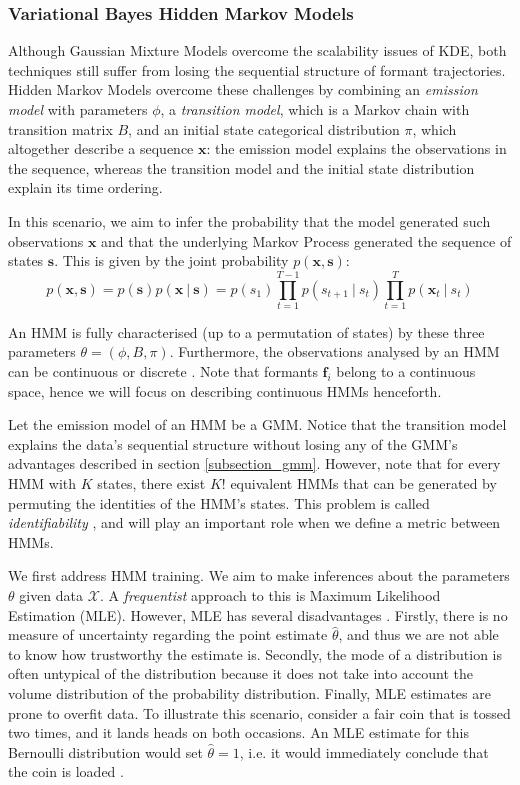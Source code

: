 \documentclass[pdftex,11pt,a4paper]{article}
\theoremstyle{definition}
\theoremstyle{remark}
\newcommand*{\V}[1]{\mathbf{#1}}%
\newcommand\given[1][]{\:#1\vert\:}
\begin{document}
\subsubsection{Variational Bayes Hidden Markov Models} \label{sub_hmms}
Although Gaussian Mixture Models overcome the scalability issues of KDE, both techniques still suffer from losing the sequential structure of formant trajectories. Hidden Markov Models overcome these challenges by combining an \emph{emission model} with parameters $\phi$, a \emph{transition model}, which is a Markov chain with transition matrix $B$, and an initial state categorical distribution $\pi$, which altogether describe a sequence $\V{x}$: the emission model explains the observations in the sequence, whereas the transition model and the initial state distribution explain its time ordering.
\par In this scenario, we aim to infer the probability that the model generated such observations $\V{x}$ and that the underlying Markov Process generated the sequence of states $\V{s}$. This is given by the joint probability $p(\V{x}, \V{s})$:
\begin{equation}\label{eq:hmm}
p(\V{x}, \V{s}) = p(\V{s})p(\V{x} \given \V{s}) = p(s_1)\prod_{t=1}^{T-1}p(s_{t+1}\given s_t)\prod_{t=1}^Tp(\V{x}_t \given s_t)
\end{equation} 
\par An HMM is fully characterised (up to a permutation of states) by these three parameters $\theta = (\phi, B, \pi)$. Furthermore, the observations analysed by an HMM can be continuous or discrete \cite{Jurafsky2009}. Note that formants $\V{f}_i$ belong to a continuous space, hence we will focus on describing continuous HMMs henceforth.
\par Let the emission model of an HMM be a GMM. Notice that the transition model explains the data's sequential structure without losing any of the GMM's advantages described in section \ref{subsection_gmm}. However, note that for every HMM with $K$ states, there exist $K!$ equivalent HMMs that can be generated by permuting the identities of the HMM's states. This problem is called \emph{identifiability} \cite{Bishop2006}, and will play an important role when we define a metric between HMMs. 
\par We first address HMM training. We aim to make inferences about the parameters $\theta$ given data $\mathcal{X}$. A \emph{frequentist} approach to this is Maximum Likelihood Estimation (MLE). However, MLE has several disadvantages \cite{Murphy2012}. Firstly, there is no measure of uncertainty regarding the point estimate $\hat{\theta}$, and thus we are not able to know how trustworthy the estimate is. Secondly, the mode of a distribution is often untypical of the distribution \cite{Murphy2012} because it does not take into account the volume distribution of the probability distribution. Finally, MLE estimates are prone to overfit data. To illustrate this scenario, consider a fair coin that is tossed two times, and it lands heads on both occasions. An MLE estimate for this Bernoulli distribution would set $\hat{\theta} = 1$, i.e. it would immediately conclude that the coin is loaded \cite{Murphy2012}.
\end{document}
